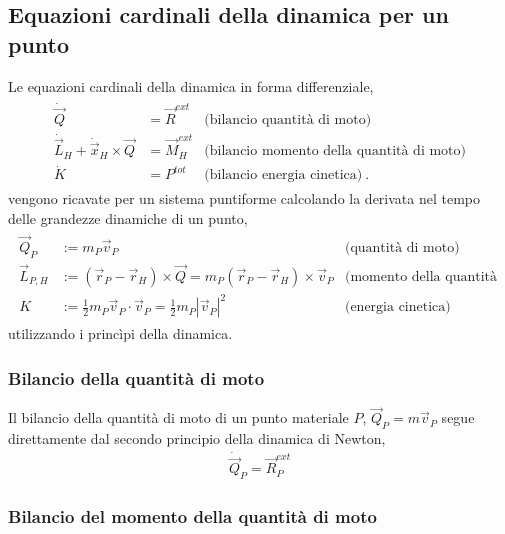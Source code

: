 \documentclass[letterpaper,10pt,italian]{jupyterBook}
\begin{document}
\subsection{Equazioni cardinali della dinamica per un punto}
\label{\detokenize{ch/mechanics/dynamics-eom-proof-point:equazioni-cardinali-della-dinamica-per-un-punto}}\label{\detokenize{ch/mechanics/dynamics-eom-proof-point:physics-hs-mechanics-dynamics-eom-point}}\label{\detokenize{ch/mechanics/dynamics-eom-proof-point::doc}}
\sphinxAtStartPar
Le equazioni cardinali della dinamica in forma differenziale,
\begin{equation*}
\begin{split}\begin{aligned}
 \dot{\vec{Q}} & = \vec{R}^{ext} & \text{(bilancio quantità di moto)} \\
 \dot{\vec{L}}_H + \dot{\vec{x}}_H \times \vec{Q} & = \vec{M}_H^{ext} & \text{(bilancio momento della quantità di moto)} \\
 \dot{K} & = P^{tot} & \text{(bilancio energia cinetica)} \ .
\end{aligned}\end{split}
\end{equation*}
\sphinxAtStartPar
vengono ricavate per un sistema puntiforme calcolando la derivata nel tempo delle grandezze dinamiche di un punto,
\begin{equation*}
\begin{split}\begin{aligned}
  \vec{Q}_P & := m_P \vec{v}_P  & \text{(quantità di moto)} \\
  \vec{L}_{P,H} & := (\vec{r}_P - \vec{r}_H) \times \vec{Q} = m_P (\vec{r}_P - \vec{r}_H) \times \vec{v}_P & \text{(momento della quantità di moto)} \\
  K & := \frac{1}{2} m_P \vec{v}_P \cdot \vec{v}_P = \frac{1}{2} m_P |\vec{v}_P|^2 & \text{(energia cinetica)}
\end{aligned}\end{split}
\end{equation*}
\sphinxAtStartPar
utilizzando i princìpi della dinamica.
\subsubsection*{Bilancio della quantità di moto}

\sphinxAtStartPar
Il bilancio della quantità di moto di un punto materiale \(P\), \(\vec{Q}_P = m \vec{v}_P\) segue direttamente dal secondo principio della dinamica di Newton,
\begin{equation*}
\begin{split}\dot{\vec{Q}}_P = \vec{R}^{ext}_P\end{split}
\end{equation*}\subsubsection*{Bilancio del momento della quantità di moto}
\end{document}
